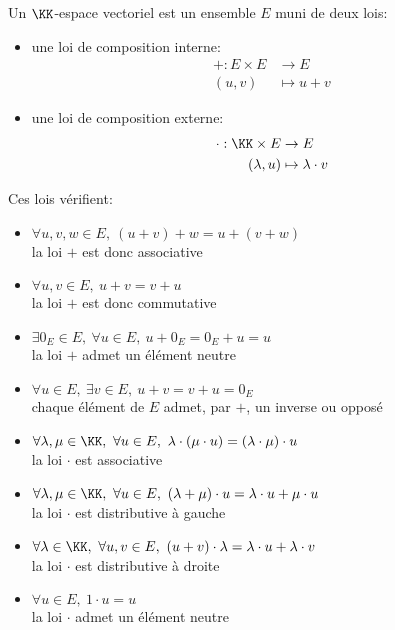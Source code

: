 \documentclass[../main.tex]{subfile}
\begin{document}
\begin{defi}
	Un $\KK$-espace vectoriel est un ensemble $E$ muni de deux lois:\\
\begin{itemize}
	\item une loi de composition interne:
	$$
\begin{aligned}
	+ : E \times E &\to E \\
	(u,v) &\mapsto u + v
\end{aligned}
	$$

	\item une loi de composition externe:
	$$
\begin{aligned}
	\cdot : \KK \times E &\to E \\
	(\lambda, u) &\mapsto \lambda \cdot v
\end{aligned}
	$$
\end{itemize}
	Ces lois vérifient:
\begin{itemize}
	\item $\forall u, v, w \in E, \ (u + v) + w = u + (v + w)$ \\
	la loi $+$ est donc associative

	\item $\forall u, v \in E, \ u + v = v + u$\\
	la loi $+$ est donc commutative

	\item $\exists 0_E \in E, \ \forall u \in E, \ u + 0_E = 0_E + u = u$\\
	la loi $+$ admet un élément neutre

	\item $\forall u \in E, \ \exists v \in E, \ u+v = v+u = 0_E$\\
	chaque élément de $E$ admet, par $+$, un inverse ou opposé

	\item $\forall \lambda, \mu \in \KK, \ \forall u \in E, \ \lambda \cdot (\mu \cdot u) = (\lambda \cdot \mu) \cdot u$\\
	la loi $\cdot$ est associative

	\item $\forall \lambda, \mu \in \KK, \ \forall u \in E, \ (\lambda + \mu) \cdot u = \lambda \cdot u + \mu \cdot u$\\
	la loi $\cdot$ est distributive à gauche

	\item $\forall \lambda \in \KK, \ \forall u, v \in E, \ (u + v) \cdot \lambda = \lambda \cdot u + \lambda \cdot v $\\
	la loi $\cdot$ est distributive à droite

	\item $\forall u \in E, \ 1 \cdot u = u$\\
	la loi $\cdot$ admet un élément neutre
\end{itemize}
\end{defi}
\end{document}
